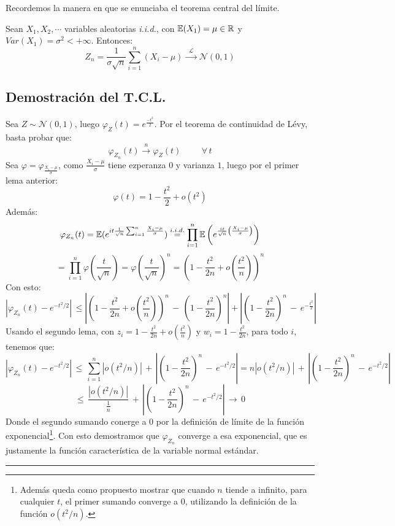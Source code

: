 Recordemos la manera en que se enunciaba el teorema central del límite.
\begin{teorema} Sean $X_1,X_2,\cdots$ variables aleatorias \textit{i.i.d.}, con $\mathbb E(X_1)=\mu\in\mathbb R$ y $Var(X_1)=\sigma^2<+\infty$. Entonces:
\[Z_n = \frac{1}{\sigma \sqrt{n}}\sum_{i=1}^{n}\left(X_i-\mu\right)\,\xrightarrow{\,\,\mathcal{L}\,\,}\,\mathcal{N}(0,1)\]
\end{teorema}
\subsection{Demostración del T.C.L.}
Sea $Z\sim \mathcal{N}(0,1)$, luego $\varphi_Z(t) = e^{\frac{-t^2}{2}}$. Por el teorema de continuidad de Lévy, basta probar que:
\[\varphi_{Z_n}(t)\xrightarrow{\,\,n\,\,}\varphi_Z(t)\hspace{1cm}\forall\,t\]
Sea $\varphi = \varphi_{\frac{X_i-\mu}{\sigma}}$, como $\frac{X_i-\mu}{\sigma}$ tiene ezperanza $0$ y varianza $1$, luego por el primer lema anterior:
\[\varphi(t) = 1-\frac{t^2}{2} + o(t^2)\]
Además: 
\[\varphi_{Z_n}(t) = \mathbb E(e^{it\frac{1}{\sqrt{n}}\sum_{i=1}^n\frac{X_i-\mu}{\sigma}}) \overset{i.i.d.}{=} \prod_{i=1}^n\mathbb E\left(e^{\frac{it}{\sqrt{n}}\left(\frac{X_i-\mu}{\sigma}\right)}\right)\]
\[ = \prod_{i=1}^n \varphi(\frac{t}{\sqrt{n}}) = \varphi(\frac{t}{\sqrt{n}})^n = \left(1-\frac{t^2}{2n}+o(\frac{t^2}{n})\right)^n\]
Con esto:
\[\left|\varphi_{Z_n}(t) - e^{-t^2/2}\right|\,\leq \left|\left(1-\frac{t^2}{2n}+o(\frac{t^2}{n})\right)^n\,-\,\left(1-\frac{t^2}{2n}\right)^n\right| + \left|\left(1-\frac{t^2}{2n}\right)^n\,-\,e^{-\frac{t^2}{2}}\right|\]
Usando el segundo lema, con $z_i = 1-\frac{t^2}{2n}+o(\frac{t^2}{n})$ y $w_i = 1-\frac{t^2}{2n}$, para todo $i$, tenemos que:
\[\left|\varphi_{Z_n}(t) - e^{-t^2/2}\right|\,\leq\,\sum_{i=1}^n\left|o(t^2/n)\right| \,+\, \left|\left(1-\frac{t^2}{2n}\right)^n\,-\,e^{-t^2/2}\right| = n|o(t^2/n)|\,+\,\left|\left(1-\frac{t^2}{2n}\right)^n\,-\,e^{-t^2/2}\right|\]
\[\leq\,\frac{|o(t^2/n)|}{\frac{1}{n}}\,+\,\left|\left(1-\frac{t^2}{2n}\right)^n\,-\,e^{-t^2/2}\right|\,\rightarrow\,0\]
Donde el segundo sumando conerge a 0 por la definición de límite de la función exponencial\footnote{Además queda como propuesto mostrar que cuando $n$ tiende a infinito, para cualquier $t$, el primer sumando converge a 0, utilizando la definición de la función $o(t^2/n)$.}. Con esto demostramos que $\varphi_{Z_n}$ converge a esa exponencial, que es justamente la función característica de la variable normal estándar. \rule{0.7em}{0.7em}